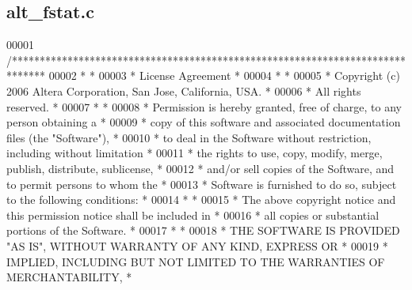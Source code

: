 \subsection{alt\+\_\+fstat.\+c}
\label{alt__fstat_8c_source}

\begin{DoxyCode}
00001 \textcolor{comment}{/******************************************************************************}
00002 \textcolor{comment}{*                                                                             *}
00003 \textcolor{comment}{* License Agreement                                                           *}
00004 \textcolor{comment}{*                                                                             *}
00005 \textcolor{comment}{* Copyright (c) 2006 Altera Corporation, San Jose, California, USA.           *}
00006 \textcolor{comment}{* All rights reserved.                                                        *}
00007 \textcolor{comment}{*                                                                             *}
00008 \textcolor{comment}{* Permission is hereby granted, free of charge, to any person obtaining a     *}
00009 \textcolor{comment}{* copy of this software and associated documentation files (the "Software"),  *}
00010 \textcolor{comment}{* to deal in the Software without restriction, including without limitation   *}
00011 \textcolor{comment}{* the rights to use, copy, modify, merge, publish, distribute, sublicense,    *}
00012 \textcolor{comment}{* and/or sell copies of the Software, and to permit persons to whom the       *}
00013 \textcolor{comment}{* Software is furnished to do so, subject to the following conditions:        *}
00014 \textcolor{comment}{*                                                                             *}
00015 \textcolor{comment}{* The above copyright notice and this permission notice shall be included in  *}
00016 \textcolor{comment}{* all copies or substantial portions of the Software.                         *}
00017 \textcolor{comment}{*                                                                             *}
00018 \textcolor{comment}{* THE SOFTWARE IS PROVIDED "AS IS", WITHOUT WARRANTY OF ANY KIND, EXPRESS OR  *}
00019 \textcolor{comment}{* IMPLIED, INCLUDING BUT NOT LIMITED TO THE WARRANTIES OF MERCHANTABILITY,    *}

\end{DoxyCode}
